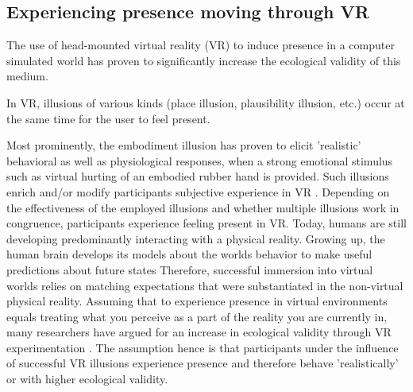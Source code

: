 \subsection{Experiencing presence moving through VR}



The use of head-mounted virtual reality (VR) to induce presence in a computer simulated world has proven to significantly increase the ecological validity of this medium. 

In VR, illusions of various kinds (place illusion, plausibility illusion, etc.) occur at the same time for the user to feel present. 

Most prominently, the embodiment illusion has proven to elicit 'realistic' behavioral as well as physiological responses, when a strong emotional stimulus such as virtual hurting of an embodied rubber hand is provided. Such illusions enrich and/or modify participants subjective experience in VR \cite{Gonzalez-Franco2017}. Depending on the effectiveness of the employed illusions and whether multiple illusions work in congruence, participants experience feeling present in VR. Today, humans are still developing predominantly interacting with a physical reality. Growing up, the human brain develops its models about the worlds behavior to make useful predictions about future states \cite{} %
Therefore, successful immersion into virtual worlds relies on matching expectations that were substantiated in the non-virtual physical reality. Assuming that to experience presence in virtual environments equals treating what you perceive as a part of the reality you are currently in, many researchers have argued for an increase in ecological validity through VR experimentation \cite{Bohil2011, Parsons2015, Parsons2017}. The assumption hence is that participants under the influence of successful VR illusions experience presence and therefore behave 'realistically' or with higher ecological validity.

